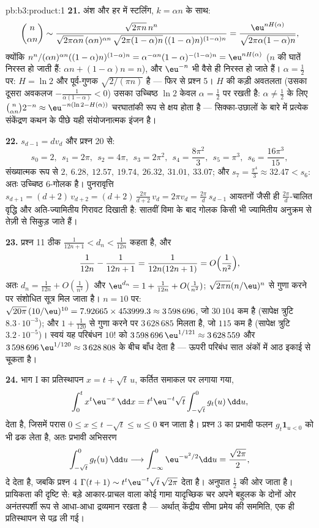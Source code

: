 \begin{solution}{pb:b3:product:1}
\textbf{21.} अंश और हर में स्टर्लिंग, $k =
\alpha n$ के साथ:
\[
\binom n{\alpha n} \sim
\frac{\sqrt{2\pi n}\,n^n}
{\sqrt{2\pi\alpha n}\,(\alpha n)^{\alpha n}\,
\sqrt{2\pi(1-\alpha)n}\,((1-\alpha)n)^{(1-\alpha)n}}
= \frac{\eu^{nH(\alpha)}}{\sqrt{2\pi\alpha(1-\alpha)n}},
\]
क्योंकि $n^n/(\alpha n)^{\alpha n}((1-\alpha)n)^{(1-\alpha)n} =
\alpha^{-\alpha n}(1-\alpha)^{-(1-\alpha)n} =
\eu^{nH(\alpha)}$ ($n$ की घातें निरस्त हो जाती हैं: $\alpha n +
(1-\alpha)n = n$), और $\eu^{-n}$
भी वैसे ही निरस्त हो जाते हैं। $\alpha = \frac12$ पर: $H = \ln2$ और पूर्व-गुणक $\sqrt{2/(\pi n)}$
है --- फिर से प्रश्न 5। $H$ की कड़ी अवतलता (उसका दूसरा अवकलज $-\frac1{\alpha(1-\alpha)} < 0$)
उसका उच्चिष्ठ $\ln 2$ केवल $\alpha = \frac12$ पर रखती है: $\alpha \neq \frac12$ के लिए $\binom n{\alpha n}2^{-n} \approx
\eu^{-n(\ln2 - H(\alpha))}$
चरघातांकी रूप से क्षय होता है --- सिक्का-उछालों के बारे में प्रत्येक
संकेंद्रण कथन के पीछे यही संयोजनात्मक इंजन है।

\textbf{22.} $s_{d-1} = dv_d$ और प्रश्न 20 से:
\[
s_0 = 2,\ \ s_1 = 2\pi,\ \ s_2 = 4\pi,\ \ s_3 = 2\pi^2,\ \
s_4 = \frac{8\pi^2}3,\ \ s_5 = \pi^3,\ \ s_6 =
\frac{16\pi^3}{15},
\]
संख्यात्मक रूप से $2,\ 6.28,\ 12.57,\ 19.74,\ 26.32,\ 31.01,\
33.07$; और $s_7 = \frac{\pi^4}3 \approx 32.47 < s_6$: अतः उच्चिष्ठ $6$-गोलक है।
पुनरावृत्ति $s_{d+1} =
(d+2)\,v_{d+2} = (d+2)\,\frac{2\pi}{d+2}\,v_d = 2\pi v_d =
\frac{2\pi}d\,s_{d-1}$ आयतनों जैसी ही $\frac{2\pi}d$-चालित वृद्धि और अति-ज्यामितीय
गिरावट दिखाती है: सातवीं विमा के बाद गोलक किसी भी ज्यामितीय अनुक्रम
से तेज़ी से सिकुड़ जाते हैं।

\textbf{23.} प्रश्न 11 ठीक $\frac1{12n+1} < d_n <
\frac1{12n}$ कहता है, और
\[
\frac1{12n} - \frac1{12n+1} = \frac1{12n(12n+1)} =
O\Bigl(\frac1{n^2}\Bigr),
\]
अतः $d_n = \frac1{12n} + O(\frac1{n^2})$ और $\eu^{d_n} = 1 +
\frac1{12n} + O(\frac1{n^2})$; $\sqrt{2\pi n}(n/\eu)^n$ से गुणा करने पर संशोधित सूत्र मिल जाता
है। $n =
10$ पर: $\sqrt{20\pi}\,(10/\eu)^{10} = 7.92665 \times 453999.3
\approx 3\,598\,696$, जो $30\,104$ कम है (सापेक्ष त्रुटि $8.3\cdot10^{-3}$); और $1 + \frac1{120}$
से गुणा करने पर $3\,628\,685$ मिलता है, जो $115$ कम है (सापेक्ष त्रुटि
$3.2\cdot10^{-5}$)। स्वयं यह परिबंधन $10!$ को $3\,598\,696\,\eu^{1/121} \approx 3\,628\,559$ और $3\,598\,696\,\eu^{1/120} \approx 3\,628\,808$ के बीच बाँध देता है
--- ऊपरी परिबंध सात अंकों में आठ इकाई से चूकता है।

\textbf{24.} भाग I का प्रतिस्थापन $x = t + \sqrt t\,u$, कर्तित समाकल पर लगाया गया,
\[
\int_0^{t} x^{t}\eu^{-x}\,\dd x
= t^{t}\eu^{-t}\sqrt t\int_{-\sqrt t}^{0} g_t(u)\,\dd u ,
\]
देता है, जिसमें परास $0 \leq x \leq t$ $-\sqrt t \leq u \leq
0$ बन जाता है। प्रश्न 3 का प्रभावी
फलन $g_t\mathbf 1_{u < 0}$ को भी ढक लेता है, अतः प्रभावी अभिसरण
\[
\int_{-\sqrt t}^{0}g_t(u)\,\dd u \longrightarrow
\int_{-\infty}^{0}\eu^{-u^2/2}\dd u = \frac{\sqrt{2\pi}}2 ,
\]
दे देता है, जबकि प्रश्न 4 $\Gamma(t+1) \sim
t^t\eu^{-t}\sqrt t\,\sqrt{2\pi}$ देता है। अनुपात $\frac12$ की ओर जाता
है। प्रायिकता की दृष्टि से: बड़े आकार-प्राचल वाला कोई गामा यादृच्छिक
चर अपने बहुलक के दोनों ओर अनंतस्पर्शी रूप से आधा-आधा द्रव्यमान रखता
है --- अर्थात् केंद्रीय सीमा प्रमेय की सममिति, एक ही प्रतिस्थापन
से पढ़ ली गई।


\end{solution}

